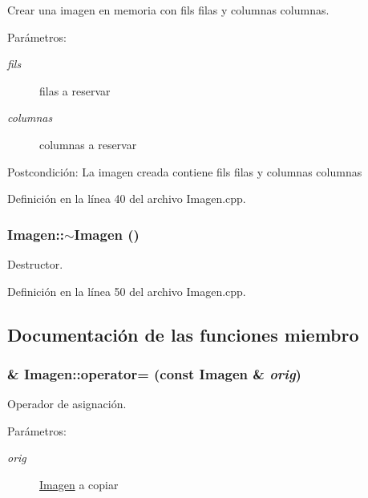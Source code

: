 Crear una imagen en memoria con fils filas y columnas columnas. 

\begin{Desc}
\item[Parámetros:]
\begin{description}
\item[{\em fils}]filas a reservar \item[{\em columnas}]columnas a reservar \end{description}
\end{Desc}
\begin{Desc}
\item[Postcondición:]La imagen creada contiene fils filas y columnas columnas \end{Desc}


Definición en la línea 40 del archivo Imagen.cpp.\hypertarget{classImagen_03dd93c9cf920a9dc0b72f8bd34f2e8a}{
\subsubsection[$\sim$Imagen]{\setlength{\rightskip}{0pt plus 5cm}Imagen::$\sim$Imagen ()}}
\label{classImagen_03dd93c9cf920a9dc0b72f8bd34f2e8a}


Destructor. 



Definición en la línea 50 del archivo Imagen.cpp.

\subsection{Documentación de las funciones miembro}
\hypertarget{classImagen_9cfdf5f496d78247026783b4026458e8}{
\subsubsection[operator=]{ \& Imagen::operator= (const {\bf Imagen} \& {\em orig})}}
\label{classImagen_9cfdf5f496d78247026783b4026458e8}


Operador de asignación. 

\begin{Desc}
\item[Parámetros:]
\begin{description}
\item[{\em orig}]\hyperlink{classImagen}{Imagen} a copiar \end{description}
\end{Desc}



